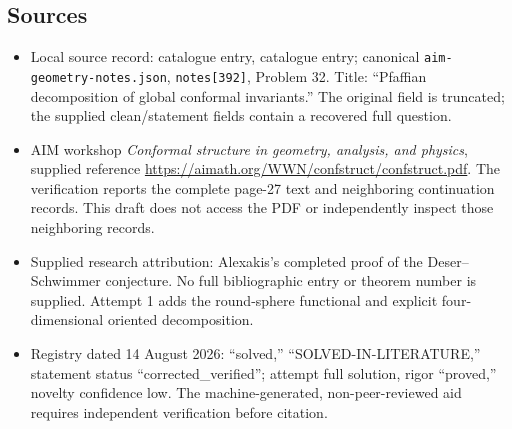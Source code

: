 \documentclass[11pt]{article}
\begin{document}
\subsection{Sources}
\begin{itemize}
\item Local source record: catalogue entry, catalogue entry; canonical \texttt{aim-geometry-notes.json}, \texttt{notes[392]}, Problem 32. Title: ``Pfaffian decomposition of global conformal invariants.'' The original field is truncated; the supplied clean/statement fields contain a recovered full question.
\item AIM workshop \emph{Conformal structure in geometry, analysis, and physics}, supplied reference \url{https://aimath.org/WWN/confstruct/confstruct.pdf}. The verification reports the complete page-27 text and neighboring continuation records. This draft does not access the PDF or independently inspect those neighboring records.
\item Supplied research attribution: Alexakis's completed proof of the Deser--Schwimmer conjecture. No full bibliographic entry or theorem number is supplied. Attempt 1 adds the round-sphere functional and explicit four-dimensional oriented decomposition.
\item Registry dated 14 August 2026: ``solved,'' ``SOLVED-IN-LITERATURE,'' statement status ``corrected\_verified''; attempt full solution, rigor ``proved,'' novelty confidence low. The machine-generated, non-peer-reviewed aid requires independent verification before citation.
\end{itemize}
\end{document}
